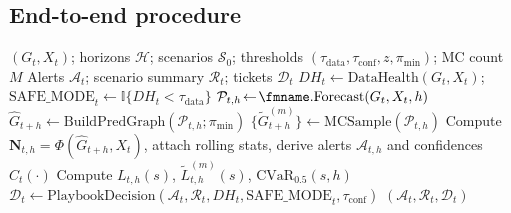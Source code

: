 \subsection{End-to-end procedure}
\begin{algorithm}[h]
\caption{\sysname{}: one decision epoch.}
\label{alg:agent_loop}
\small
\begin{algorithmic}[1]
\Require $(G_t,X_t)$; horizons $\mathcal{H}$; scenarios
$\mathcal{S}_0$; thresholds
$(\tau_{\mathrm{data}},\tau_{\mathrm{conf}},z,\pi_{\min})$; MC count $M$
\Ensure Alerts $\mathcal{A}_t$; scenario summary $\mathcal{R}_t$;
tickets $\mathcal{D}_t$
\State $DH_t\!\gets\!\mathrm{DataHealth}(G_t,X_t)$;
$\mathrm{SAFE\_MODE}_t\!\gets\!\mathbb{I}\{DH_t\!<\!\tau_{\mathrm{data}}\}$
  \State $\mathcal{P}_{t,h}\!\gets\!\text{\fmname.Forecast}(G_t,X_t,h)$
  \State $\widehat{G}_{t+h}\!\gets\!\mathrm{BuildPredGraph}(\mathcal{P}_{t,h};\pi_{\min})$
  \State $\{\widetilde{G}^{(m)}_{t+h}\}\!\gets\!\mathrm{MCSample}(\mathcal{P}_{t,h})$
  \State Compute $\mathbf{N}_{t,h}\!=\!\Phi(\widehat{G}_{t+h},X_t)$,
                       attach rolling stats, derive alerts
                       $\mathcal{A}_{t,h}$ and confidences $C_t(\cdot)$
    \State Compute $L_{t,h}(s)$, $\widetilde{L}^{(m)}_{t,h}(s)$,
                   $\mathrm{CVaR}_{0.5}(s,h)$
  \EndFor
\EndFor
\State $\mathcal{D}_t\!\gets\!\mathrm{PlaybookDecision}(\mathcal{A}_t,
                       \mathcal{R}_t,DH_t,\mathrm{SAFE\_MODE}_t,\tau_{\mathrm{conf}})$
\State \Return $(\mathcal{A}_t,\mathcal{R}_t,\mathcal{D}_t)$
\end{algorithmic}
\end{algorithm}
